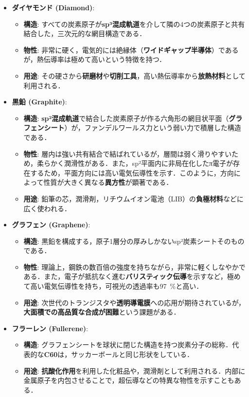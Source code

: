 \documentclass[11pt,a4paper]{ltjsarticle}
\newcommand{\supcite}[1]{\textsuperscript{\cite{#1}}}
\begin{document}
\begin{itemize}
\item \textbf{ダイヤモンド (Diamond)}:
  \begin{itemize}
  \item \textbf{構造}: すべての炭素原子が\textbf{sp³混成軌道}を介して隣の4つの炭素原子と共有結合した，三次元的な網目構造である\supcite{ref1}．
  \item \textbf{物性}: 非常に硬く，電気的には絶縁体（\textbf{ワイドギャップ半導体}）であるが，熱伝導率は極めて高いという特徴を持つ．
  \item \textbf{用途}: その硬さから\textbf{研磨材}や\textbf{切削工具}，高い熱伝導率から\textbf{放熱材料}として利用される\supcite{ref1}．
  \end{itemize}

\item \textbf{黒鉛 (Graphite)}:
  \begin{itemize}
  \item \textbf{構造}: \textbf{sp²混成軌道}で結合した炭素原子が作る六角形の網目状平面（\textbf{グラフェンシート}）が，ファンデルワールス力という弱い力で積層した構造である\supcite{ref1}．
  \item \textbf{物性}: 層内は強い共有結合で結ばれているが，層間は弱く滑りやすいため，柔らかく潤滑性がある．また，sp²平面内に非局在化したπ電子が存在するため，平面方向には高い電気伝導性を示す．このように，方向によって性質が大きく異なる\textbf{異方性}が顕著である\supcite{ref1}．
  \item \textbf{用途}: 鉛筆の芯，潤滑剤，リチウムイオン電池（LIB）の\textbf{負極材料}などに広く使われる\supcite{ref1}．
  \end{itemize}

\item \textbf{グラフェン (Graphene)}:
  \begin{itemize}
  \item \textbf{構造}: 黒鉛を構成する，原子1層分の厚みしかないsp²炭素シートそのものである\supcite{ref1}．
  \item \textbf{物性}: 理論上，鋼鉄の数百倍の強度を持ちながら，非常に軽くしなやかである．また，電子が抵抗なく進む\textbf{バリスティック伝導}を示すなど，極めて高い電気伝導性を持ち，可視光の透過率も\SI{97}{\percent}と高い．
  \item \textbf{用途}: 次世代のトランジスタや\textbf{透明導電膜}への応用が期待されているが，\textbf{大面積での高品質な合成が困難}という課題がある\supcite{ref1}．
  \end{itemize}

\item \textbf{フラーレン (Fullerene)}:
  \begin{itemize}
  \item \textbf{構造}: グラフェンシートを球状に閉じた構造を持つ炭素分子の総称．代表的な\textbf{C60}は，サッカーボールと同じ形状をしている\supcite{ref1}．
  \item \textbf{用途}: \textbf{抗酸化作用}を利用した化粧品や，潤滑剤として利用される．内部に金属原子を内包させることで，超伝導などの特異な物性を示すこともある\supcite{ref1}．
  \end{itemize}


\end{itemize}
\end{document}
